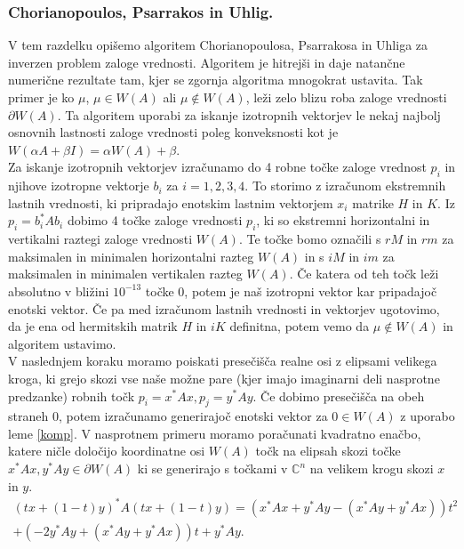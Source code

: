 \documentclass[12pt,a4paper]{amsart}
\theoremstyle{definition}
\theoremstyle{plain}
\newcommand{\C}{\mathbb C}
\begin{document}
\subsubsection{Chorianopoulos, Psarrakos in Uhlig.}
V tem razdelku opišemo algoritem Chorianopoulosa, Psarrakosa in Uhliga za inverzen problem zaloge vrednosti. 
Algoritem je hitrejši in daje natančne numerične rezultate tam, kjer se zgornja algoritma mnogokrat ustavita. Tak primer je ko $\mu$, $\mu \in W(A)$ ali $\mu \not\in W(A)$, leži zelo blizu roba zaloge vrednosti $\partial W(A)$. Ta algoritem uporabi za iskanje izotropnih vektorjev le nekaj najbolj osnovnih lastnosti zaloge vrednosti poleg konveksnosti kot je $W(\alpha A +\beta I)=\alpha W(A) +\beta$.\\
Za iskanje izotropnih vektorjev izračunamo do 4 robne točke zaloge vrednost $p_i$ in njihove izotropne vektorje $b_i$ za $i=1,2,3,4$. To storimo z izračunom ekstremnih lastnih vrednosti, ki pripradajo enotskim lastnim vektorjem $x_i$ %
matrike $H$ in $K$. Iz $p_i =b^\ast _i Ab_i$ dobimo 4 točke zaloge vrednosti $p_i$, ki so ekstremni horizontalni in vertikalni raztegi zaloge vrednosti $W(A)$. Te točke bomo označili s $rM$ in $rm$ za maksimalen in minimalen horizontalni razteg $W(A)$ in s $iM$ in $im$ za maksimalen in minimalen vertikalen razteg $W(A)$. Če katera od teh točk leži absolutno v bližini $10^{-13}$  točke 0, potem je naš izotropni vektor kar pripadajoč enotski vektor. Če pa med izračunom lastnih vrednosti in vektorjev ugotovimo, da je ena od hermitskih matrik $H$ in $iK$ definitna, potem vemo da $\mu \not\in W(A)$ in algoritem ustavimo.\\
V naslednjem koraku moramo poiskati presečišča realne osi z elipsami velikega kroga, ki grejo skozi vse naše možne pare (kjer imajo imaginarni deli nasprotne predzanke) robnih točk $p_i=x^\ast Ax, p_j=y^\ast  Ay$. Če dobimo presečišča na obeh straneh 0, potem izračunamo generirajoč enotski vektor za $0\in W(A)$ z uporabo leme \ref{komp}.
V nasprotnem primeru moramo poračunati kvadratno enačbo, katere ničle določijo koordinatne osi $W(A)$ točk na elipsah skozi točke $x^\ast Ax,y^\ast Ay\in \partial W(A)$ %
ki se generirajo s točkami v $\C^n$ na velikem krogu skozi $x$ in $y$.
\begin{multline}\label{eq:en3}
(tx +(1-t)y)^\ast A(tx+(1-t)y)=(x^\ast Ax+y^\ast Ay -(x^\ast Ay +y^\ast Ax))t^2 \\
+(-2y^\ast Ay +(x^\ast Ay+y^\ast Ax))t +y^\ast Ay.
\end{multline}
\end{document}
